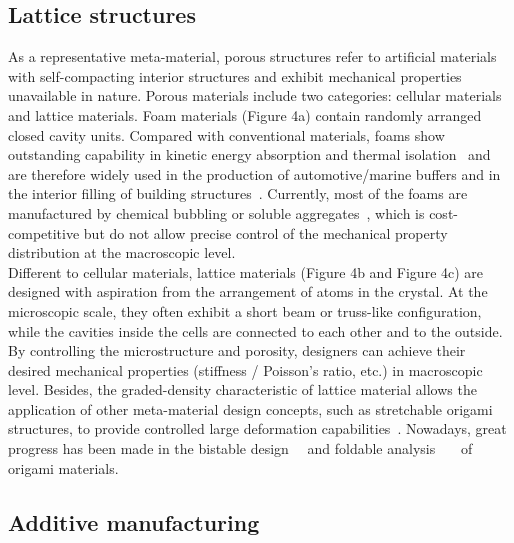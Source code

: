 \documentclass[12pt]{extbook}
\begin{document}
\subsection{Lattice structures}

As a representative meta-material, porous structures refer to artificial materials with self-compacting interior structures and exhibit mechanical properties unavailable in nature. Porous materials include two categories: cellular materials and lattice materials. Foam materials (Figure 4a) contain randomly arranged closed cavity units. Compared with conventional materials, foams show outstanding capability in kinetic energy absorption and thermal isolation~\cite{elmarakbi2013advanced} and are therefore widely used in the production of automotive/marine buffers and in the interior filling of building structures~\cite{mazur2017mechanical}. Currently, most of the foams are manufactured by chemical bubbling or soluble aggregates~\cite{fleck2004overview}, which is cost-competitive but do not allow precise control of the mechanical property distribution at the macroscopic level.\\

Different to cellular materials, lattice materials (Figure 4b and Figure 4c) are designed with aspiration from the arrangement of atoms in the crystal. At the microscopic scale, they often exhibit a short beam or truss-like configuration, while the cavities inside the cells are connected to each other and to the outside. By controlling the microstructure and porosity, designers can achieve their desired mechanical properties (stiffness / Poisson's ratio, etc.) in macroscopic level. Besides, the graded-density characteristic of lattice material allows the application of other meta-material design concepts, such as stretchable origami structures, to provide controlled large deformation capabilities~\cite{bobbert2018towards}. Nowadays, great progress has been made in the bistable design~\cite{jianguo2014morphology}~\cite{jianguo2015bistable} and foldable analysis~\cite{cai2016deployment}~\cite{cai2016motion}~\cite{cai2017deployment} of origami materials.\\

\subsection{Additive manufacturing}
\end{document}
